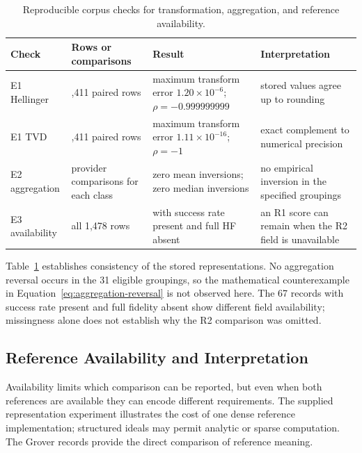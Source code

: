 \documentclass[10pt,conference]{IEEEtran}
\begin{document}
\begin{table}[ht]
\centering
\caption{Reproducible corpus checks for transformation, aggregation, and reference availability.}
\label{tab:corpus-checks}
\renewcommand{\arraystretch}{1.1}
\begin{tabularx}{\textwidth}{@{}l>{\raggedright\arraybackslash}p{}
>{\raggedright\arraybackslash}p{}>{\raggedright\arraybackslash}X@{}}
\toprule
\textbf{Check} & \textbf{Rows or comparisons} & \textbf{Result} & \textbf{Interpretation} \\
\midrule
E1 Hellinger & 1,411 paired rows & maximum transform error $1.20\times10^{-6}$; $\rho=-0.999999999$ & stored values agree up to rounding \\
E1 TVD & 1,411 paired rows & maximum transform error $1.11\times10^{-16}$; $\rho=-1$ & exact complement to numerical precision \\
E2 aggregation & 31 provider comparisons for each class & zero mean inversions; zero median inversions & no empirical inversion in the specified groupings \\
E3 availability & all 1,478 rows & 67 with success rate present and full HF absent & an R1 score can remain when the R2 field is unavailable \\
\bottomrule
\end{tabularx}
\end{table}

Table~\ref{tab:corpus-checks} establishes consistency of the stored representations. No aggregation reversal occurs in the 31 eligible groupings, so the mathematical counterexample in Equation~\ref{eq:aggregation-reversal} is not observed here. The 67 records with success rate present and full fidelity absent show different field availability; missingness alone does not establish why the R2 comparison was omitted.

\subsection{Reference Availability and Interpretation}
\label{sec:reference-evidence}

Availability limits which comparison can be reported, but even when both references are available they can encode different requirements. The supplied representation experiment illustrates the cost of one dense reference implementation; structured ideals may permit analytic or sparse computation. The Grover records provide the direct comparison of reference meaning.
\end{document}
